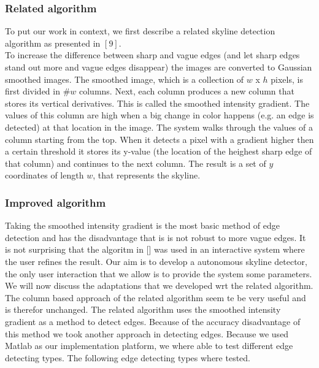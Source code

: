

\subsubsection{Related algorithm}
To put our work in context, we first describe
a related skyline detection algorithm as presented in %
$[9]$.\\

To increase the difference between sharp and vague edges (and let sharp edges
stand out more and vague edges disappear) the images are converted to Gaussian
smoothed images.  The smoothed image, which is a collection of $w$ x $h$ pixels,
is first divided in \#$w$ columns.  Next, each column produces a new column that
stores its vertical derivatives. This is called the smoothed intensity gradient.
The values of this column are high when a big change in color happens (e.g. an
edge is detected) at that location in the image. 
The system walks through the values of a column starting from the top.  When it
detects a pixel with a gradient higher then a certain threshold it stores its
y-value (the location of the heighest sharp edge of that column) and continues
to the next column.  The result is a set of $y$ coordinates of length $w$, that
represents the skyline. 

\subsubsection{Improved algorithm}
Taking the smoothed intensity gradient is the most basic method of edge
detection and has the disadvantage that is is not robust to more vague edges. It
is not surprising that the algoritm in []%
was used in an interactive system
where the user refines the result. 
Our aim is to develop a autonomous skyline detector, the only user interaction
that we allow is to provide the system some parameters. We will now discuss
the adaptations that we developed wrt the related algorithm.\\

The column based approach of the related algorithm seem te be very useful and is therefor unchanged. 
The related algorithm uses the smoothed intensity gradient as a method to detect edges. 
Because of the accuracy disadvantage of this method we took another approach in
detecting edges. Because we used Matlab as our implementation platform, we where
able to test different edge detecting types. The following edge detecting types
where tested.

